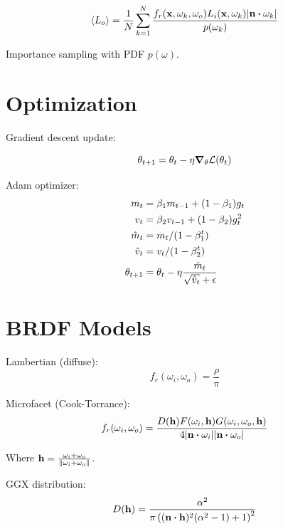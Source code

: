 \documentclass[12pt,a4paper]{article}
\begin{document}
\begin{equation}\label{eq:mc}
\langle L_o \rangle = \frac{1}{N} \sum_{k=1}^N \frac{f_r(\vb{x}, \omega_k, \omega_o) L_i(\vb{x}, \omega_k) \abs{\vb{n} \vdot \omega_k}}{p(\omega_k)}
\end{equation}

Importance sampling with PDF $p(\omega)$.

\section{Optimization}\label{sec:optimization}
Gradient descent update:

\begin{equation}\label{eq:gd}
\vb{\theta}_{t+1} = \vb{\theta}_t - \eta \grad_{\vb{\theta}} \mathcal{L}(\vb{\theta}_t)
\end{equation}

Adam optimizer:
\begin{align}
m_t &= \beta_1 m_{t-1} + (1 - \beta_1) g_t \\
v_t &= \beta_2 v_{t-1} + (1 - \beta_2) g_t^2 \\
\hat{m}_t &= m_t / (1 - \beta_1^t) \\
\hat{v}_t &= v_t / (1 - \beta_2^t) \\
\vb{\theta}_{t+1} &= \vb{\theta}_t - \eta \frac{\hat{m}_t}{\sqrt{\hat{v}_t} + \epsilon}
\end{align}

\section{BRDF Models}\label{sec:brdf}
Lambertian (diffuse):
\begin{equation}
f_r(\omega_i, \omega_o) = \frac{\rho}{\pi}
\end{equation}

Microfacet (Cook-Torrance):
\begin{equation}\label{eq:cook-torrance}
f_r(\omega_i, \omega_o) = \frac{D(\vb{h}) F(\omega_i, \vb{h}) G(\omega_i, \omega_o, \vb{h})}{4 \abs{\vb{n} \vdot \omega_i} \abs{\vb{n} \vdot \omega_o}}
\end{equation}

Where $\vb{h} = \frac{\omega_i + \omega_o}{\norm{\omega_i + \omega_o}}$.

GGX distribution:
\begin{equation}
D(\vb{h}) = \frac{\alpha^2}{\pi \left( (\vb{n} \vdot \vb{h})^2 (\alpha^2 - 1) + 1 \right)^2}
\end{equation}
\end{document}
